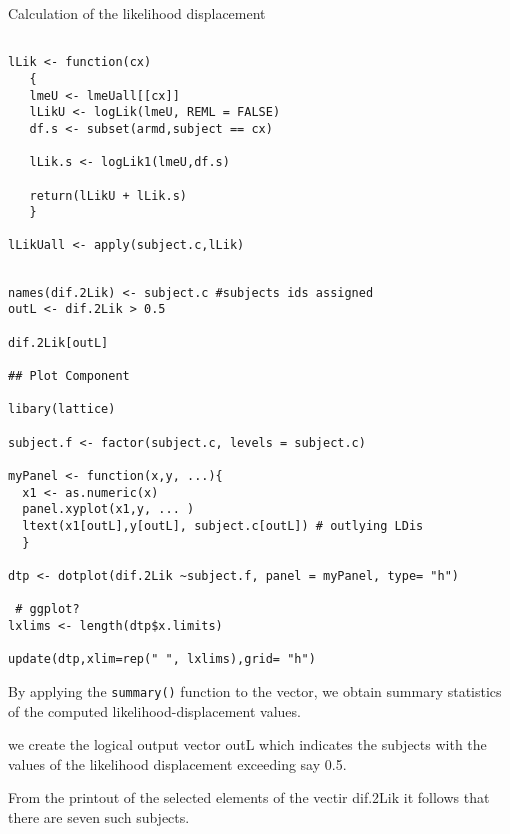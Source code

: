 
Calculation of the likelihood displacement

\begin{framed}
\begin{verbatim}

lLik <- function(cx)
   {
   lmeU <- lmeUall[[cx]]
   lLikU <- logLik(lmeU, REML = FALSE)
   df.s <- subset(armd,subject == cx)
 
   lLik.s <- logLik1(lmeU,df.s)

   return(lLikU + lLik.s)
   }

lLikUall <- apply(subject.c,lLik)

\end{verbatim}
\end{framed}

%

\begin{framed}
\begin{verbatim}

names(dif.2Lik) <- subject.c #subjects ids assigned
outL <- dif.2Lik > 0.5

dif.2Lik[outL]

## Plot Component

libary(lattice)

subject.f <- factor(subject.c, levels = subject.c)

myPanel <- function(x,y, ...){
  x1 <- as.numeric(x)
  panel.xyplot(x1,y, ... )
  ltext(x1[outL],y[outL], subject.c[outL]) # outlying LDis
  }

dtp <- dotplot(dif.2Lik ~subject.f, panel = myPanel, type= "h")

 # ggplot?
lxlims <- length(dtp$x.limits)

update(dtp,xlim=rep(" ", lxlims),grid= "h")
\end{verbatim}
\end{framed}


By applying the \texttt{summary()} function to the vector, we obtain summary statistics of the computed likelihood-displacement values.

we create the logical output vector outL which indicates the subjects with the values of the 
likelihood displacement exceeding say 0.5.

From the printout of the selected elements of the vectir dif.2Lik it follows that there are
seven such subjects.


